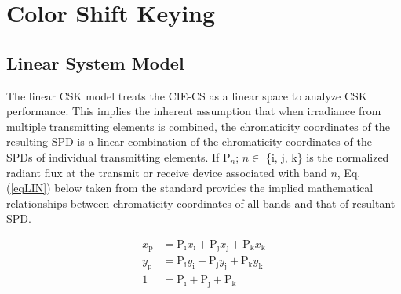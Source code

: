 \section{Color Shift Keying}
\label{sec:csk}
\graphicspath{{_MIMOColor/figures_csk/}}

\subsection{Linear System Model}
\label{subsec:cskLinear}
The linear CSK model treats the CIE-CS as a linear space to analyze CSK performance. This implies the inherent assumption that when irradiance from multiple transmitting elements is combined, the chromaticity coordinates of the resulting SPD is a linear combination of the chromaticity coordinates of the SPDs of individual transmitting elements. If P$_{n}$; $n\in$ \{i, j, k\} is the normalized radiant flux at the transmit or receive device associated with band $n$, Eq.(\ref{eqLIN}) below taken from the standard provides the implied mathematical relationships between chromaticity coordinates of all bands and that of resultant SPD.

\begin{equation}
	\begin{aligned}
	x_{\text{p}} &= \text{P}_{\text{i}}x_{\text{i}} + \text{P}_{\text{j}}x_{\text{j}} + \text{P}_{\text{k}}x_{\text{k}}\\
	y_{\text{p}} &= \text{P}_{\text{i}}y_{\text{i}} + \text{P}_{\text{j}}y_{\text{j}} + \text{P}_{\text{k}}y_{\text{k}}\\
	1 &= \text{P}_{\text{i}} + \text{P}_{\text{j}} + \text{P}_{\text{k}}
\end{aligned}
\label{eqLIN}
\end{equation}


